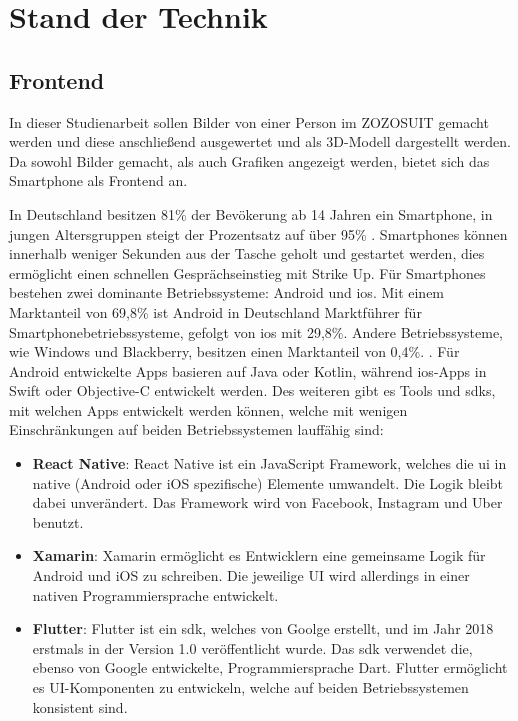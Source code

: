 \chapter{Stand der Technik}
\label{ch:sdt}

\section{Frontend}

In dieser Studienarbeit sollen Bilder von einer Person im ZOZOSUIT gemacht werden und diese anschließend ausgewertet und als 3D-Modell dargestellt werden. Da sowohl Bilder 
gemacht, als auch Grafiken angezeigt werden, bietet sich das Smartphone als Frontend an. 

In Deutschland besitzen 81\% der Bevökerung ab 14 Jahren ein Smartphone, in jungen Altersgruppen steigt der Prozentsatz auf über 95\% \cite{misc:marktforschung_smartphone}. 
Smartphones können innerhalb weniger Sekunden aus der Tasche geholt und gestartet werden, dies ermöglicht einen schnellen Gesprächseinstieg mit Strike Up. \newline
Für Smartphones bestehen zwei dominante Betriebssysteme: Android und i\acrshort{os}. Mit einem Marktanteil von 69,8\% ist Android in Deutschland Marktführer für 
Smartphonebetriebssysteme, gefolgt von i\acrshort{os} mit 29,8\%. Andere Betriebssysteme, wie Windows und Blackberry, 
besitzen einen Marktanteil von 0,4\%. \cite{misc:kantarworldpanel}. \newline
Für Android entwickelte Apps basieren auf Java oder Kotlin, während i\acrshort{os}-Apps in Swift oder Objective-C entwickelt werden. Des weiteren gibt es Tools und \glspl{sdk}, 
mit welchen Apps entwickelt werden können, welche mit wenigen Einschränkungen auf beiden Betriebssystemen lauffähig sind:
\begin{itemize}
    \item \textbf{React Native}: React Native ist ein JavaScript Framework, welches die \gls{ui} in native (Android oder iOS spezifische) Elemente umwandelt. Die Logik bleibt dabei unverändert. Das Framework wird von Facebook, Instagram und Uber benutzt.
    \item \textbf{Xamarin}: Xamarin ermöglicht es Entwicklern eine gemeinsame Logik für Android und iOS zu schreiben. Die jeweilige UI wird allerdings in einer nativen Programmiersprache entwickelt.
    \item \textbf{Flutter}: Flutter ist ein \gls{sdk}, welches von Goolge erstellt, und im Jahr 2018 erstmals in der Version 1.0 veröffentlicht wurde. Das \gls{sdk} verwendet die, ebenso von Google entwickelte, Programmiersprache Dart. Flutter ermöglicht es UI-Komponenten zu entwickeln, welche auf beiden Betriebssystemen konsistent sind.
\end{itemize}

